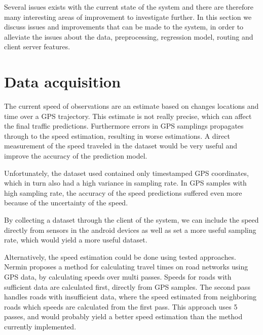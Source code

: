 Several issues exists with the current state of the system and there are therefore many interesting areas of improvement to investigate further. In this section we discuss issues and improvements that can be made to the system, in order to alleviate the issues about the data, preprocessing, regression model, routing and client server features.

\section{Data acquisition}
The current speed of observations are an estimate based on changes locations and time over a GPS trajectory. This estimate is not really precise, which can affect the final traffic predictions. Furthermore errors in GPS samplings propagates through to the speed estimation, resulting in worse estimations. A direct measurement of the speed traveled in the dataset would be very useful and improve the accuracy of the prediction model.

Unfortunately, the dataset used contained only timestamped GPS coordinates, which in turn also had a high variance in sampling rate. In GPS samples with high sampling rate, the accuracy of the speed predictions suffered even more because of the uncertainty of the speed.

By collecting a dataset through the client of the system, we can include the speed directly from sensors in the android devices as well as set a more useful sampling rate, which would yield a more useful dataset.

Alternatively, the speed estimation could be done using tested approaches. Nermin\cite{Mudzelet07} proposes a method for calculating travel times on road networks using GPS data, by calculating speeds over multi passes. Speeds for roads with sufficient data are calculated first, directly from GPS samples. The second pass handles roads with insufficient data, where the speed estimated from neighboring roads which speeds are calculated from the first pass. This approach uses 5 passes, and would probably yield a better speed estimation than the method currently implemented.

